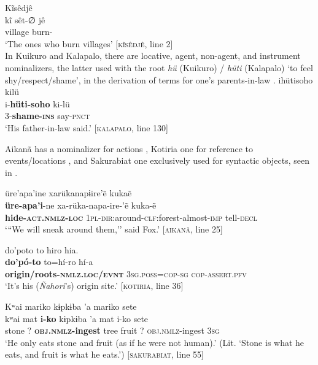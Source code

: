 \documentclass[output=paper,
modfonts,nonflat
]{langsci/langscibook}
\begin{document}
\ea\label{ex:intro:8} Kĩsêdjê \\[.3em]
\gll kĩ      sêt-∅        jê    \\
     village burn-\Nmlz{} \Pl{} \\
\glt ‘The ones who burn villages’ [\textsc{kĩsêdjê}, line 2] \\
\z  
In Kuikuro and Kalapalo, there are locative, agent, non-agent, and instrument nominalizers, the latter used with the root \emph{hü} (Kuikuro) / \emph{hüti} (Kalapalo) ‘to feel shy/respect/shame’, in the derivation of terms for one’s parents-in-law . 
\ea\label{ex:intro:9}  ihütisoho kilü\\[.3em]
\gll i-\textbf{hüti-soho} ki-lü\\
     3-\textbf{shame-\textsc{ins}} say-\textsc{pnct}\\
\glt ‘His father-in-law said.’ [\textsc{kalapalo}, line 130]
\z 

Aikanã has a nominalizer for actions ,  Kotiria one for reference to events/lo\-ca\-tions , and Sakurabiat one exclusively used for syntactic objects, seen in . 

\ea\label{ex:intro:10}   üre'apa'ine xarükanapɨire'ẽ kukaẽ \\[.3em]
\gll \textbf{üre-apa'i}-ne xa-rüka-napa-ire-'ẽ kuka-ẽ\\
    \textbf{hide-\textsc{act.nmlz-loc}} \textsc{1pl-dir:}around-\textsc{clf:}forest-almost\textsc{-imp} tell-\textsc{decl}\\
\glt  `{``}We will sneak around them,'' said Fox.'  [\textsc{aikanã}, line 25]\\
\z

\ea\label{ex:intro:11} do'poto	to hiro	hia. \\[.3em]
\gll      \textbf{do'pó-to}	to=hí-ro	hí-a \\
          \textbf{origin/roots-\textsc{nmlz.loc/evnt}}	3\textsc{sg.poss=cop-sg} 	\textsc{cop-assert.pfv} \\
\glt ‘It's his (\textit{Ñahori}’s) origin site.’ [\textsc{kotiria}, line 36]
\z
 
\ea\label{ex:intro:12} Kʷai mariko kɨpkɨba 'a mariko sete\\[.3em]
\gll kʷai mat \textbf{i-ko} kɨpkɨba 'a mat i-ko sete\\
     stone ? \textbf{\textsc{obj.nmlz}-ingest} tree fruit ? \textsc{obj.nmlz}-ingest \textsc{3sg}\\
\glt ‘He only eats stone and fruit (as if he were not human).’ (Lit. ‘Stone is what he eats, and fruit is what he eats.’) [\textsc{sakurabiat}, line 55]
\z
\end{document}
